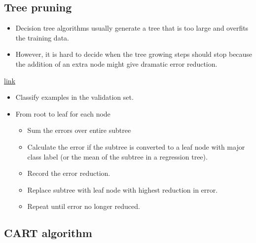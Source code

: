 \begin{refsection}
\subsection{Tree pruning}

\begin{remark}\hfill
	\begin{itemize}
		\item Decision tree algorithms usually generate a tree that is too large and overfits the training data.
		\item However, it is hard to decide when the tree growing steps should stop because the addition of an extra node might give dramatic error reduction.
	\end{itemize}	
	
\end{remark}

\href{http://faculty.cs.tamu.edu/ioerger/cs633-spr10/pruning.ppt}{link}

\begin{method}
	\begin{itemize}
		\item Classify examples in the validation set.
		\item From root to leaf for each node
		\begin{itemize}
			\item Sum the errors over entire subtree
			\item Calculate the error if the subtree is converted to a leaf node with major class label (or the mean of the subtree in a regression tree).
			\item Record the error reduction.
			\item Replace subtree with leaf node with highest reduction in error.
			\item Repeat until error no longer reduced.
		\end{itemize}
	\end{itemize}	
\end{method}



\subsection{CART algorithm}

\begin{algorithm}[H]
	\SetAlgoLined
	

\end{algorithm}
\end{refsection}

